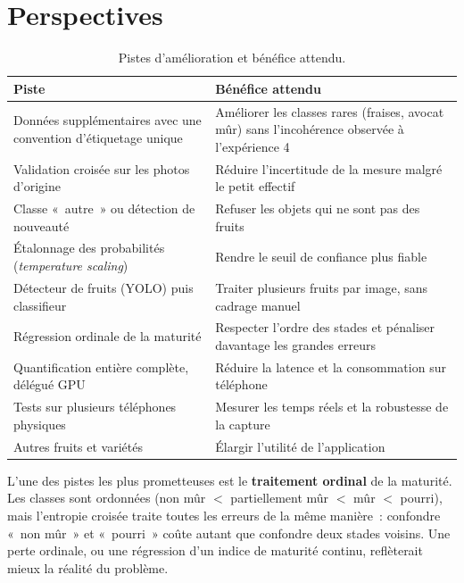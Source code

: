 \section{Perspectives}

\begin{table}[H]
\centering
\caption{Pistes d’amélioration et bénéfice attendu.}\label{tab:persp}
\small
\begin{tabularx}{\textwidth}{@{}p{4.1cm}X@{}}
\toprule
\textbf{Piste} & \textbf{Bénéfice attendu} \\
\midrule
Données supplémentaires avec une convention d’étiquetage unique & Améliorer les classes rares (fraises, avocat mûr) sans l’incohérence observée à l’expérience 4 \\
Validation croisée sur les photos d’origine & Réduire l’incertitude de la mesure malgré le petit effectif \\
Classe «~autre~» ou détection de nouveauté & Refuser les objets qui ne sont pas des fruits \\
Étalonnage des probabilités (\emph{temperature scaling}) & Rendre le seuil de confiance plus fiable \\
Détecteur de fruits (YOLO) puis classifieur & Traiter plusieurs fruits par image, sans cadrage manuel \\
Régression ordinale de la maturité & Respecter l’ordre des stades et pénaliser davantage les grandes erreurs \\
Quantification entière complète, délégué GPU & Réduire la latence et la consommation sur téléphone \\
Tests sur plusieurs téléphones physiques & Mesurer les temps réels et la robustesse de la capture \\
Autres fruits et variétés & Élargir l’utilité de l’application \\
\bottomrule
\end{tabularx}
\end{table}

L’une des pistes les plus prometteuses est le \textbf{traitement ordinal} de la maturité. Les classes sont ordonnées (non mûr $<$ partiellement mûr $<$ mûr $<$ pourri), mais l’entropie croisée traite toutes les erreurs de la même manière~: confondre «~non mûr~» et «~pourri~» coûte autant que confondre deux stades voisins. Une perte ordinale, ou une régression d’un indice de maturité continu, reflèterait mieux la réalité du problème.
